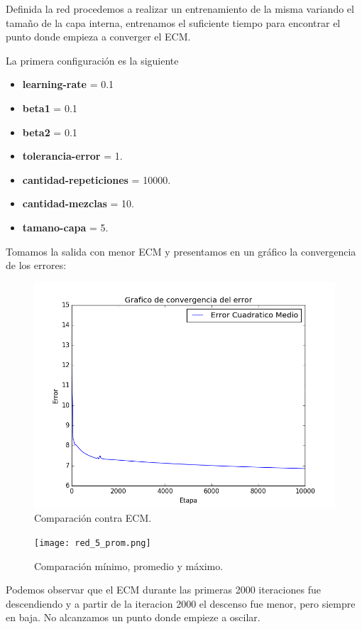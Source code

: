 \documentclass[onecolumn,10pt]{article}
\begin{document}
Definida la red procedemos a realizar  un entrenamiento de la misma 
variando el tamaño de la capa interna, entrenamos el suficiente tiempo para
encontrar el punto donde empieza a converger el ECM.

La primera configuración es la siguiente

\begin{itemize}
\item \textbf{learning-rate} = 0.1
\item \textbf{beta1} = 0.1
\item \textbf{beta2} = 0.1
\item \textbf{tolerancia-error} = 1.
\item \textbf{cantidad-repeticiones} = 10000.
\item \textbf{cantidad-mezclas} = 10.
\item \textbf{tamano-capa} = 5.
\end{itemize}


Tomamos la salida con menor ECM y presentamos en un gráfico la convergencia
de los errores:

\begin{figure}[H]
  \centering
  \includegraphics[width=0.8\columnwidth]{red_5_ecm.png}
  \caption{Comparación contra ECM.}
  \label{fig:red 5 ECM}
\end{figure}



\begin{figure}[H]
  \centering
  \texttt{[image: red\_5\_prom.png]}
  \caption{Comparación mínimo, promedio y máximo.}
  \label{fig:red promedios}
\end{figure}

Podemos observar que el ECM durante las primeras 2000 iteraciones fue descendiendo
y a partir de la iteracion 2000 el descenso fue menor, pero siempre en baja.
No alcanzamos un punto donde empieze a oscilar.
\end{document}
